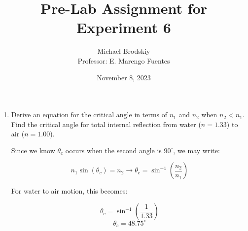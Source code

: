 


\title{Pre-Lab Assignment for Experiment 6}
\date{November 8, 2023}
\author{Michael Brodskiy\\ \small Professor: E. Marengo Fuentes}



\maketitle

\begin{enumerate}

  \item Derive an equation for the critical angle in terms of $n_1$ and $n_2$ when $n_2 < n_1$. Find the critical angle for total internal reflection from water ($n=1.33$) to air ($n=1.00$). 

    Since we know $\theta_c$ occurs when the second angle is $90^{\circ}$, we may write:

      $$n_1\sin(\theta_c)=n_2\longrightarrow \theta_c=\sin^{-1}\left(\frac{n_2}{n_1}\right)$$

    For water to air motion, this becomes:

    $$\theta_c=\sin^{-1}\left( \frac{1}{1.33} \right)$$
    $$\boxed{\theta_c=48.75^{\circ}}$$

\end{enumerate}



